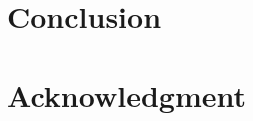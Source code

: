 \documentclass[journal]{IEEEtran}
\begin{document}
\section{Conclusion}
\label{sec:conclusion}

\section*{Acknowledgment}



\end{document}
